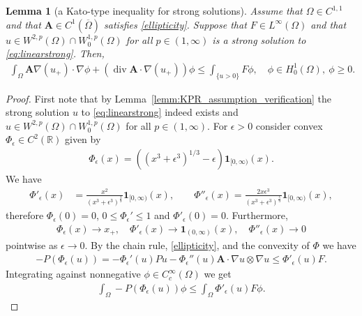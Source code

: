 \documentclass[12pt,a4paper]{amsart}
\newtheorem{lemma}[theorem]{\bf Lemma}
\theoremstyle{definition}
\newcommand{\R}{\mathbb{R}}
\newcommand{\A}{\mathbf{A}}
\newcommand*\Div{\operatorname{div}}
\begin{document}
\begin{lemma}[a Kato-type inequality for strong solutions]\label{lem:Katoidentity}
    Assume that $\Omega \in C^{1,1}$ and that $\A\in C^{1}(\overline{\Omega})$ satisfies \eqref{ellipticity}. Suppose that $F\in L^\infty(\Omega)$ and that $u\in W^{2,p}(\Omega)\cap W^{1,p}_0(\Omega)$ for all $p\in(1,\infty)$ is a strong solution to \eqref{eq:linearstrong}. Then,    \begin{align}\label{eq:Kato1}
    \int_{\Omega} \A \nabla (u_+) \cdot \nabla \phi + (\Div \A \cdot \nabla (u_+))\phi \leq \int_{\{u>0\}} F\phi,\quad \phi\in H^1_0(\Omega),\ \phi \geq 0.
\end{align}
\end{lemma}
\begin{proof}
     First note that by Lemma~\ref{lemm:KPR_assumption_verification} the strong solution $u$  to \eqref{eq:linearstrong} indeed exists and $u\in W^{2,p}(\Omega)\cap W^{1,p}_0(\Omega)$ for all $p\in(1,\infty)$. 
     For $\epsilon >0$ consider convex $\Phi_\epsilon \in C^2(\R)$ given by
     \begin{align*}
         \Phi_\epsilon(x) = ((x^3 + \epsilon^3)^{1/3} - \epsilon)\textbf{1}_{[0,\infty)}(x).
     \end{align*}
     We have 
     \begin{align*}
         \Phi'_\epsilon(x) &= \frac{x^2}{(x^3 + \epsilon^3)^{\frac 23}}\textbf{1}_{[0,\infty)}(x),\qquad 
         \Phi''_\epsilon(x) = \frac{2x\epsilon^3}{(x^3 + \epsilon^3)^{\frac 53}}\textbf{1}_{[0,\infty)}(x),
     \end{align*}
     therefore $\Phi_\epsilon(0) = 0$, $0\leq \Phi_\epsilon'\leq 1$ and $\Phi'_\epsilon(0) = 0$. Furthermore, \begin{align*}
         \Phi_\epsilon(x) \to x_+,\quad \Phi'_\epsilon(x) \to \textbf{1}_{(0,\infty)}(x),\quad \Phi''_\epsilon(x) \to 0
     \end{align*} pointwise as $\epsilon \to 0$. By the chain rule, \eqref{ellipticity}, and the convexity of $\Phi$ we have
    \begin{align*}
        -P(\Phi_\epsilon(u)) = -\Phi_\epsilon'(u) Pu - \Phi_\epsilon''(u) \A \cdot \nabla u\otimes \nabla u \leq \Phi'_\epsilon(u) F.
    \end{align*}
    Integrating against nonnegative $\phi\in C_c^\infty(\Omega)$ we get
    \begin{align*}
        \int_{\Omega} -P(\Phi_\epsilon(u)) \phi \leq \int_{\Omega} \Phi'_\epsilon(u) F \phi.
    \end{align*}

\end{proof}
\end{document}

